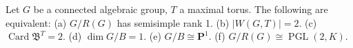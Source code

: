 Let $G$ be a connected algebraic group, $T$ a maximal torus. The following are equivalent:
(a) $G/R(G)$ has semisimple rank 1.
(b) $|W(G, T)| = 2$.
(c) $\operatorname{Card} \mathfrak{B}^T = 2$.
(d) $\dim G/B = 1$.
(e) $G/B \cong \mathbf{P}^1$.
(f) $G/R(G) \cong \operatorname{PGL}(2, K)$.
